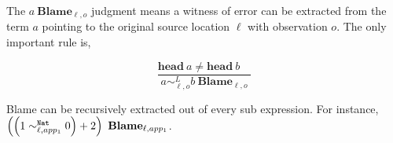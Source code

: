 The $a\ \mathbf{Blame}_{\ell,o}$ judgment means a witness of error can be extracted from the term $a$ pointing to the original source location $\ell$ with observation $o$.
The only important rule is,

\[
\frac{\mathbf{head}\ a\neq\mathbf{head}\ b\quad}{a\sim_{\ell,o}^{L}b\ \mathbf{Blame}_{\ell,o}}
\]

Blame can be recursively extracted out of every sub expression.
For instance, $\left(\left(1\sim_{\ell,app_{1}}^{\mathtt{Nat}{} }0\right)+2\right)\ \mathbf{Blame}_{\ell,app_{1}}$.

